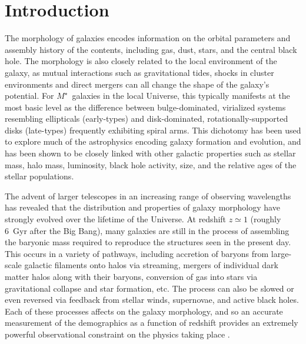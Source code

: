 \documentclass[twocolumn]{aastex6}
\begin{document}

\section{Introduction} \label{sec:intro}

The morphology of galaxies encodes information on the orbital parameters and assembly history of the contents, including gas, dust, stars, and the central black hole. The morphology is also closely related to the local environment of the galaxy, as mutual interactions such as gravitational tides, shocks in cluster environments and direct mergers can all change the shape of the galaxy's potential. For $M^\star$~galaxies in the local Universe, this typically manifests at the most basic level as the difference between bulge-dominated, virialized systems resembling ellipticals (early-types) and disk-dominated, rotationally-supported disks (late-types) frequently exhibiting spiral arms. This dichotomy has been used to explore much of the astrophysics encoding galaxy formation and evolution, and has been shown to be closely linked with other galactic properties such as stellar mass, halo mass, luminosity, black hole activity, size, and the relative ages of the stellar populations. 

The advent of larger telescopes in an increasing range of observing wavelengths has revealed that the distribution and properties of galaxy morphology have strongly evolved over the lifetime of the Universe. At redshift $z\simeq1$ (roughly 6~Gyr after the Big Bang), many galaxies are still in the process of assembling the baryonic mass required to reproduce the structures seen in the present day. This occurs in a variety of pathways, including accretion of baryons from large-scale galactic filaments onto halos via streaming, mergers of individual dark matter halos along with their baryons, conversion of gas into stars via gravitational collapse and star formation, etc. The process can also be slowed or even reversed via feedback from stellar winds, supernovae, and active black holes. Each of these processes affects on the galaxy morphology, and so an accurate measurement of the demographics as a function of redshift provides an extremely powerful observational constraint on the physics taking place \citep[for a recent review see][]{con14}. 
\end{document}

